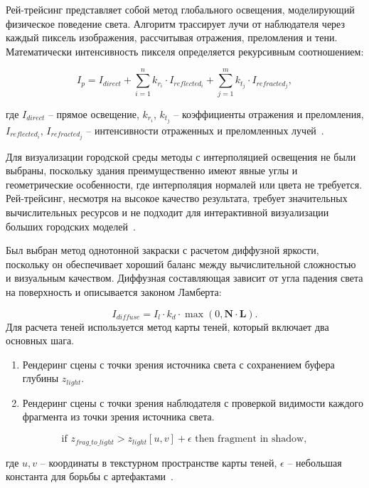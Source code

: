Рей-трейсинг представляет собой метод глобального освещения, моделирующий физическое поведение света. Алгоритм трассирует лучи от наблюдателя через каждый пиксель изображения, рассчитывая отражения, преломления и тени. Математически интенсивность пикселя определяется рекурсивным соотношением:

\begin{equation}
I_p = I_{direct} + \sum_{i=1}^{n} k_{r_i} \cdot I_{reflected_i} + \sum_{j=1}^{m} k_{t_j} \cdot I_{refracted_j},
\end{equation}

где $I_{direct}$ -- прямое освещение, $k_{r_i}$, $k_{t_j}$ -- коэффициенты отражения и преломления, $I_{reflected_i}$, $I_{refracted_j}$ -- интенсивности отраженных и преломленных лучей~\cite{whitted_raytracing}.

Для визуализации городской среды методы с интерполяцией освещения не были выбраны, поскольку здания преимущественно имеют явные углы и геометрические особенности, где интерполяция нормалей или цвета не требуется. Рей-трейсинг, несмотря на высокое качество результата, требует значительных вычислительных ресурсов и не подходит для интерактивной визуализации больших городских моделей~\cite{realtime_rendering}.

Был выбран метод однотонной закраски с расчетом диффузной яркости, поскольку он обеспечивает хороший баланс между вычислительной сложностью и визуальным качеством. Диффузная составляющая зависит от угла падения света на поверхность и описывается законом Ламберта:

\begin{equation}
I_{diffuse} = I_l \cdot k_d \cdot \max(0, \mathbf{N} \cdot \mathbf{L}).
\end{equation}
Для расчета теней используется метод карты теней, который включает два основных шага.
\begin{enumerate}
\item Рендеринг сцены с точки зрения источника света с сохранением буфера глубины $z_{light}$.
\item Рендеринг сцены с точки зрения наблюдателя с проверкой видимости каждого фрагмента из точки зрения источника света.
\end{enumerate}
\begin{equation}
\text{if } z_{frag\_to\_light} > z_{light}[u,v] + \epsilon \text{ then fragment in shadow},
\end{equation}

где $u,v$ -- координаты в текстурном пространстве карты теней, $\epsilon$ -- небольшая константа для борьбы с артефактами~\cite{shadow_mapping_technique}.

